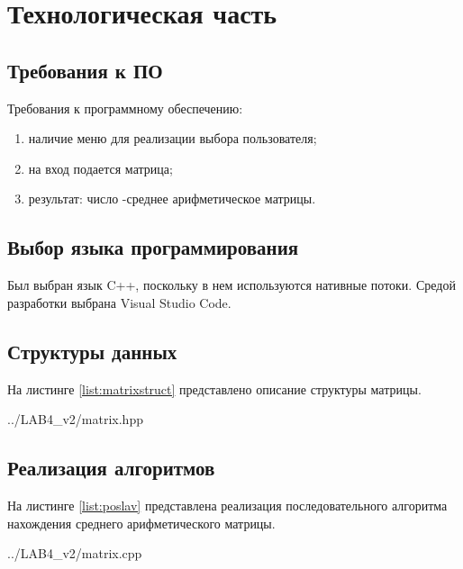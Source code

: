 
\chapter{Технологическая часть}\label{tecnology}

\section{Требования к ПО}\label{Requirements}

Требования к программному обеспечению:
\begin{enumerate}
    \item наличие меню для реализации выбора пользователя;
    \item на вход подается матрица;
    \item результат: число -среднее арифметическое матрицы. 
\end{enumerate}

\section{Выбор языка программирования}\label{Language}

Был выбран язык C++, поскольку в нем используются нативные потоки. Средой разработки выбрана Visual Studio Code.

\section{Структуры данных}\label{StructsList}

На листинге \ref{list:matrixstruct} представлено описание структуры матрицы.

\begin{lstinputlisting}
    [caption = {Структура матрицы},
    label = {list:matrixstruct},
    linerange={21-25},
    ]{../LAB4_v2/matrix.hpp}
\end{lstinputlisting}

\section{Реализация алгоритмов}\label{Listings}

На листинге \ref{list:poslav} представлена реализация последовательного алгоритма нахождения среднего арифметического матрицы.

\begin{lstinputlisting}
    [caption = {Реализация последовательного алгоритма нахождения среднего арифметического матрицы},
    label = {list:poslav},
    linerange={46-55},
    ]{../LAB4_v2/matrix.cpp}
\end{lstinputlisting}

